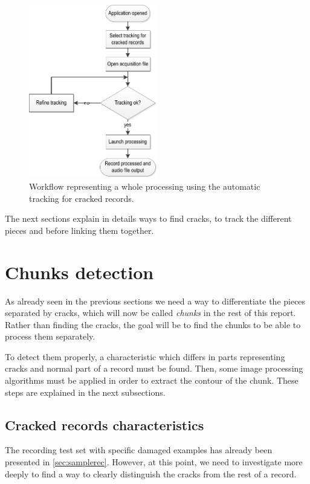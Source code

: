 \begin{figure}[!ht]
\centering
\includegraphics[width=0.5\textwidth]{images/auto-track-flow}
\caption{Workflow representing a whole processing using the automatic tracking for cracked records.}
\label{fig:autotrackflow}
\end{figure}

The next sections explain in details ways to find cracks, to track the different pieces and before linking them together.

\section{Chunks detection}

As already seen in the previous sections we need a way to differentiate the pieces separated by cracks, which will now be called \emph{chunks} in the rest of this report. Rather than finding the cracks, the goal will be to find the chunks to be able to process them separately.

To detect them properly, a characteristic which differs in parts representing cracks and normal part of a record must be found. Then, some image processing algorithms must be applied in order to extract the contour of the chunk. These steps are explained in the next subsections.

\subsection{Cracked records characteristics}
\label{sec:crackrecchar}

The recording test set with specific damaged examples has already been presented in \autoref{sec:samplerec}. However, at this point, we need to investigate more deeply to find a way to clearly distinguish the cracks from the rest of a record.

